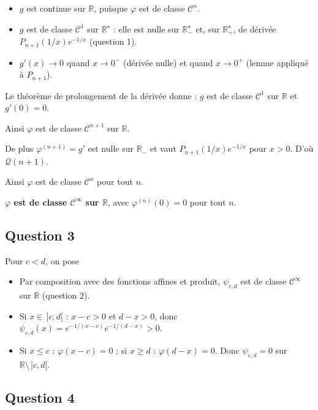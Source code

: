 \documentclass[11pt,a4paper]{article}
\providecommand{\tightlist}{\setlength{\itemsep}{0pt}\setlength{\parskip}{0pt}}
\newcommand{\equationajustee}[1]{%
  \sbox{\boiteequation}{$\displaystyle #1$}%
  \ifdim\wd\boiteequation>\linewidth
    \[\resizebox{\linewidth}{!}{\usebox{\boiteequation}}\]%
  \else
    \[#1\]%
  \fi}
\begin{document}
\begin{itemize}
\tightlist
\item
  \(g\) est continue sur \(\mathbb R\), puisque \(\varphi\) est de classe \(\mathcal C^n\).
\item
  \(g\) est de classe \(\mathcal C^1\) sur \(\mathbb R^\star\) : elle est nulle sur \(\mathbb R_-^\star\) et, sur \(\mathbb R_+^\star\), de dérivée \(P_{n+1}(1/x)e^{-1/x}\) (question 1).
\item
  \(g'(x)\to0\) quand \(x\to0^-\) (dérivée nulle) et quand \(x\to0^+\) (lemme appliqué à \(P_{n+1}\)).
\end{itemize}

Le théorème de prolongement de la dérivée donne : \(g\) est de classe \(\mathcal C^1\) sur \(\mathbb R\) et \(g'(0)=0\).

Ainsi \(\varphi\) est de classe \(\mathcal C^{n+1}\) sur \(\mathbb R\).

De plus \(\varphi^{(n+1)}=g'\) est nulle sur \(\mathbb R_-\) et vaut \(P_{n+1}(1/x)e^{-1/x}\) pour \(x>0\). D'où \(\mathcal Q(n+1)\).

Ainsi \(\varphi\) est de classe \(\mathcal C^n\) pour tout \(n\).

\textbf{\(\varphi\) est de classe \(\mathcal C^\infty\) sur \(\mathbb R\)}, avec \(\varphi^{(n)}(0)=0\) pour tout \(n\).

\hypertarget{question-3}{%
\subsection{Question 3}\label{question-3}}

Pour \(c<d\), on pose

\equationajustee{\boxed{\psi_{c,d}(x)=\varphi(x-c)\,\varphi(d-x)\qquad(x\in\mathbb R).}}

\begin{itemize}
\tightlist
\item
  Par composition avec des fonctions affines et produit, \(\psi_{c,d}\) est de classe \(\mathcal C^\infty\) sur \(\mathbb R\) (question 2).
\item
  Si \(x\in\,]c,d[\) : \(x-c>0\) et \(d-x>0\), donc \(\psi_{c,d}(x)=e^{-1/(x-c)}e^{-1/(d-x)}>0\).
\item
  Si \(x\le c\) : \(\varphi(x-c)=0\) ; si \(x\ge d\) : \(\varphi(d-x)=0\). Donc \(\psi_{c,d}=0\) sur \(\mathbb R\setminus\,]c,d[\).
\end{itemize}

\hypertarget{question-4}{%
\subsection{Question 4}\label{question-4}}
\end{document}
